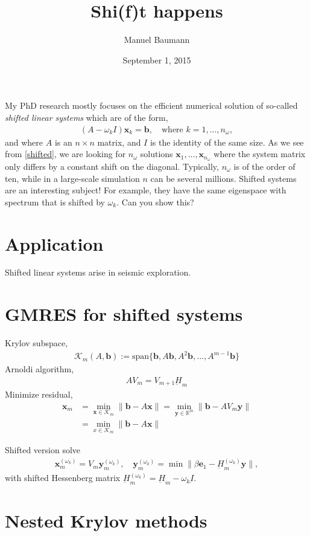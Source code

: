 \documentclass{article}
\title{\bf Shi(f)t happens}
\author{Manuel Baumann}
\date{September 1, 2015}
\begin{document}
 \maketitle
 My PhD research mostly focuses on the efficient numerical solution of so-called \textit{shifted linear systems} which are of the form,
 \begin{align}
 \label{shifted}
  (A - \omega_k I) \mathbf{x}_k = \mathbf{b}, \quad \text{where } k = 1,...,n_\omega,
 \end{align}
 and where $A$ is an $n \times n$ matrix, and $I$ is the identity of the same size. As we see from \eqref{shifted}, we are looking for $n_\omega$ solutions $\mathbf{x}_1,..., \mathbf{x}_{n_\omega}$ where the system matrix only differs by a constant shift on the diagonal. Typically, $n_\omega$ is of the order of ten, while in a large-scale simulation $n$ can be several millions. Shifted systems are an interesting subject! For example, they have the same eigenspace with spectrum that is shifted by $\omega_k$. Can you show this?
 \section{Application}
 Shifted linear systems arise in seismic exploration. 
 \section{GMRES for shifted systems}
 Krylov subspace,
 \begin{align*}
  \mathcal{K}_m(A,\mathbf{b}) := \text{span} \{\mathbf{b}, A \mathbf{b}, A^2 \mathbf{b},...,A^{m-1}\mathbf{b} \}
 \end{align*}
 Arnoldi algorithm,
 \begin{align*}
 AV_m = V_{m+1}\underbar{H}_m
 \end{align*}
 Minimize residual,
 \begin{align*}
 \mathbf{x}_m &= \min_{\mathbf{x} \in \mathcal{K}_m} \| \mathbf{b} - A \mathbf{x}\|
              = \min_{\mathbf{y} \in \mathbb{R}^m} \| \mathbf{b} - A V_m\mathbf{y}\| \\
              &= \min_{x \in \mathcal{K}_m} \| \mathbf{b} - A \mathbf{x}\|
 \end{align*}
 \cite{GL96}
 
 Shifted version \cite{F98} solve
 \begin{align*}
 \mathbf{x}_m^{(\omega_k)} = V_m \mathbf{y}_m^{(\omega_k)}, \quad \mathbf{y}_m^{(\omega_k)}= \min \| \beta \mathbf{e}_1 - \underbar{H}_m^{(\omega_k)} \mathbf{y}\|, 
 \end{align*}
 with shifted Hessenberg matrix $\underbar{H}_m^{(\omega_k)} = \underbar{H}_m - \omega_k \underbar{I}$.
 \section{Nested Krylov methods}
 \cite{BG14}
 
 
\end{document}
